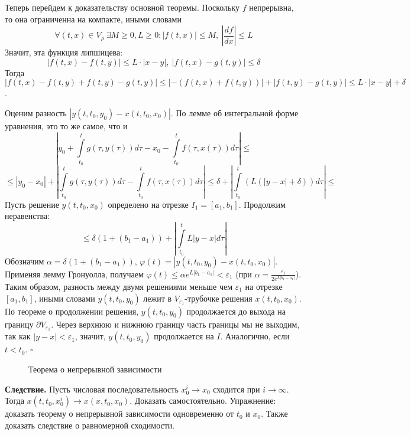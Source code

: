 Теперь перейдем к доказательству основной теоремы. Поскольку $f$ непрерывна,
то она ограниченна на компакте, иными словами
$$\forall (t,x)\in V_\rho~\exists M\geqslant 0,L\geqslant 0:
|f(t,x)|\leqslant M,~\left| \frac{df}{dx} \right|\leqslant L $$
Значит, эта функция липшицева:
$$|f(t,x)-f(t,y)|\leqslant L\cdot |x-y|,~|f(t,x)-g(t,y)|\leqslant \delta$$
Тогда $|f(t,x)-f(t,y)+f(t,y)-g(t,y)|\leqslant |-(f(t,x)+f(t,y))|+
|f(t,y)-g(t,y)|\leqslant L\cdot |x-y|+\delta$.

Оценим разность $|y(t,t_0,y_0)-x(t,t_0,x_0)|$. По лемме об интегральной
форме уравнения, это то же самое, что и 
$$\left| y_0+\int\limits_{t_0}^{t} g(\tau,y(\tau))d\tau -x_0 -
 \int\limits_{t_0}^{t} f(\tau,x(\tau))d\tau \right| \leqslant 
$$
$$
\leqslant 
|y_0-x_0|+\left|\int\limits_{t_0}^{t} g(\tau,y(\tau))d\tau -
\int\limits_{t_0}^{t} f(\tau,x(\tau))d\tau \right|\leqslant 
\delta+\left| \int\limits_{t_0}^{t} (L(|y-x|+\delta))d\tau \right|\leqslant 
$$
Пусть решение $y(t,t_0,x_0)$ определено на отрезке $I_1=[a_1,b_1]$. 
Продолжим неравенства:
$$
\leqslant \delta(1+(b_1-a_1))+\left| \int\limits_{t_0}^{t} L|y-x|d\tau\right| 
$$
Обозначим $\alpha=\delta(1+(b_1-a_1))$, 
$\varphi(t)=|y(t,t_0,y_0)-x(t,t_0,x_0)|$. Применяя лемму Гронуолла, получаем
$\varphi(t)\leqslant \alpha e^{L|b_1-a_1|}<\varepsilon_1$ (при 
$\alpha=\frac{\varepsilon_1}{2e^{L|b_1-a_1|}}$).
Таким образом, разность между двумя решениями меньше чем $\varepsilon_1$ на 
отрезке $[a_1,b_1]$, иными словами $y(t,t_0,y_0)$ лежит в 
$V_{\varepsilon_1}$-трубочке решения $x(t,t_0,x_0)$. По теореме о продолжении
решения,  $y(t,t_0,y_0)$ продолжается до выхода на границу
$\partial V_{\varepsilon_1}$. Через верхнюю и нижнюю границу часть границы
мы не выходим, так как $|y-x|<\varepsilon_1$, значит, $y(t,t_0,y_0)$
продолжается на $I$. Аналогично, если  $t<t_0$. $\square$
\begin{figure}[H]
    \centering
    
    \caption{Теорема о непрерывной зависимости}
    \label{fig:}
\end{figure}

\textbf{Следствие.} Пусть числовая последовательность 
$x^i_0\to x_0$ сходится при $i\to\infty$. 
Тогда $x(t,t_0,x^i_0)\to x(x,t_0,x_0)$. Доказать самостоятельно. Упражнение:
доказать теорему о непрерывной зависимости одновременно от $t_0$ и $x_0$.
Также доказать следствие о равномерной сходимости.

